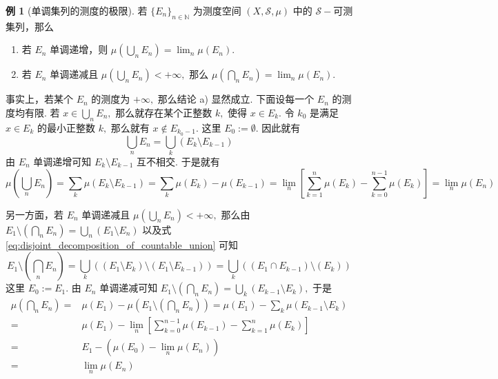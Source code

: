 \documentclass[12pt, a4paper, oneside]{book}
\numberwithin{figure}{section}
\theoremstyle{definition}
\newtheorem{example}[theorem]{例}
\begin{document}
\begin{example}[单调集列的测度的极限]
    若 $\{E_n\}_{n\in\mathbb N}$ 为测度空间 $(X,\mathcal S,\mu)$ 中的 $\mathcal S-$可测集列，那么
    \begin{enumerate}[label=\alph*)]
        \item 若 $E_n$ 单调递增，则 $\mu(\bigcup_n E_n) = \lim_{n} \mu(E_n).$
        \item 若 $E_n$ 单调递减且 $\mu(\bigcup_n E_n)<+\infty,$ 那么 $\mu(\bigcap_n E_n)=\lim_n \mu(E_n).$
    \end{enumerate}
\end{example}
事实上，若某个 $E_n$ 的测度为 $+\infty,$ 那么结论 a) 显然成立. 下面设每一个 $E_n$ 的测度均有限. 若 $x\in\bigcup_n E_n,$ 那么就存在某个正整数 $k,$ 使得 $x\in E_k.$ 
令 $k_0$ 是满足 $x\in E_k$ 的最小正整数 $k,$ 那么就有 $x\notin E_{k_0-1}.$ 这里 $E_0:=\emptyset.$ 因此就有 
\begin{equation}\label{eq:disjoint_decomposition_of_countable_union}
    \bigcup_n E_n = \bigcup_k (E_k\setminus E_{k-1})
\end{equation}
由 $E_n$ 单调递增可知 $E_k\setminus E_{k-1}$ 互不相交. 于是就有
\begin{equation}
    \mu(\bigcup_n E_n) = \sum_k \mu(E_k\setminus E_{k-1}) = \sum_{k} \mu(E_k) - \mu(E_{k-1}) = \lim_n \left[\sum_{k=1}^n \mu(E_k)-\sum_{k=0}^{n-1}\mu(E_k)\right] = \lim_n \mu(E_n)
\end{equation}

另一方面，若 $E_n$ 单调递减且 $\mu(\bigcup_n E_n)<+\infty,$ 那么由 $E_1\setminus(\bigcap_n E_n)=\bigcup_n (E_1\setminus E_n)$ 以及式 \eqref{eq:disjoint_decomposition_of_countable_union} 可知
\begin{equation}
    E_1\setminus\left(\bigcap_n E_n\right) = \bigcup_k \left((E_1\setminus E_k)\setminus (E_1\setminus E_{k-1})\right) = \bigcup_k \left((E_1\cap E_{k-1})\setminus (E_k)\right)
\end{equation}
这里 $E_0:=E_1.$ 由 $E_n$ 单调递减可知 $E_1\setminus\left(\bigcap_n E_n\right)=\bigcup_k (E_{k-1}\setminus E_k),$ 于是 
\begin{equation}
    \begin{aligned}
        \mu\left(\bigcap_n E_n\right)=&\mu(E_1)-\mu\left(E_1\setminus\left(\bigcap_n E_n\right)\right)=\mu(E_1)-\sum_k \mu(E_{k-1}\setminus E_k) \\
        =& \mu(E_1)-\lim_n \left[\sum_{k=0}^{n-1}\mu(E_{k-1})-\sum_{k=1}^n \mu(E_k)\right]\\
        =& E_1-\left(\mu(E_0)-\lim_n \mu(E_n)\right)\\
        =&\lim_n \mu(E_n)
    \end{aligned}
\end{equation}
\end{document}
